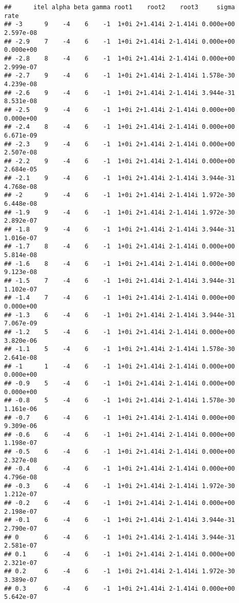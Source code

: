 \documentclass[
  12pt,
]{article}
\begin{document}
\begin{verbatim}
##      itel alpha beta gamma root1    root2    root3     sigma      rate
## -3      9    -4    6    -1  1+0i 2+1.414i 2-1.414i 0.000e+00 2.597e-08
## -2.9    7    -4    6    -1  1+0i 2+1.414i 2-1.414i 0.000e+00 0.000e+00
## -2.8    8    -4    6    -1  1+0i 2+1.414i 2-1.414i 0.000e+00 2.999e-07
## -2.7    9    -4    6    -1  1+0i 2+1.414i 2-1.414i 1.578e-30 4.239e-08
## -2.6    9    -4    6    -1  1+0i 2+1.414i 2-1.414i 3.944e-31 8.531e-08
## -2.5    9    -4    6    -1  1+0i 2+1.414i 2-1.414i 0.000e+00 0.000e+00
## -2.4    8    -4    6    -1  1+0i 2+1.414i 2-1.414i 0.000e+00 6.671e-09
## -2.3    9    -4    6    -1  1+0i 2+1.414i 2-1.414i 0.000e+00 2.507e-08
## -2.2    9    -4    6    -1  1+0i 2+1.414i 2-1.414i 0.000e+00 2.684e-05
## -2.1    9    -4    6    -1  1+0i 2+1.414i 2-1.414i 3.944e-31 4.768e-08
## -2      9    -4    6    -1  1+0i 2+1.414i 2-1.414i 1.972e-30 6.448e-08
## -1.9    9    -4    6    -1  1+0i 2+1.414i 2-1.414i 1.972e-30 2.892e-07
## -1.8    9    -4    6    -1  1+0i 2+1.414i 2-1.414i 3.944e-31 1.016e-07
## -1.7    8    -4    6    -1  1+0i 2+1.414i 2-1.414i 0.000e+00 5.814e-08
## -1.6    8    -4    6    -1  1+0i 2+1.414i 2-1.414i 0.000e+00 9.123e-08
## -1.5    7    -4    6    -1  1+0i 2+1.414i 2-1.414i 3.944e-31 1.102e-07
## -1.4    7    -4    6    -1  1+0i 2+1.414i 2-1.414i 0.000e+00 0.000e+00
## -1.3    6    -4    6    -1  1+0i 2+1.414i 2-1.414i 3.944e-31 7.067e-09
## -1.2    5    -4    6    -1  1+0i 2+1.414i 2-1.414i 0.000e+00 3.820e-06
## -1.1    5    -4    6    -1  1+0i 2+1.414i 2-1.414i 1.578e-30 2.641e-08
## -1      1    -4    6    -1  1+0i 2+1.414i 2-1.414i 0.000e+00 0.000e+00
## -0.9    5    -4    6    -1  1+0i 2+1.414i 2-1.414i 0.000e+00 0.000e+00
## -0.8    5    -4    6    -1  1+0i 2+1.414i 2-1.414i 1.578e-30 1.161e-06
## -0.7    6    -4    6    -1  1+0i 2+1.414i 2-1.414i 0.000e+00 9.309e-06
## -0.6    6    -4    6    -1  1+0i 2+1.414i 2-1.414i 0.000e+00 1.198e-07
## -0.5    6    -4    6    -1  1+0i 2+1.414i 2-1.414i 0.000e+00 2.327e-08
## -0.4    6    -4    6    -1  1+0i 2+1.414i 2-1.414i 0.000e+00 4.796e-08
## -0.3    6    -4    6    -1  1+0i 2+1.414i 2-1.414i 1.972e-30 1.212e-07
## -0.2    6    -4    6    -1  1+0i 2+1.414i 2-1.414i 0.000e+00 2.198e-07
## -0.1    6    -4    6    -1  1+0i 2+1.414i 2-1.414i 3.944e-31 2.790e-07
## 0       6    -4    6    -1  1+0i 2+1.414i 2-1.414i 3.944e-31 2.581e-07
## 0.1     6    -4    6    -1  1+0i 2+1.414i 2-1.414i 0.000e+00 2.321e-07
## 0.2     6    -4    6    -1  1+0i 2+1.414i 2-1.414i 1.972e-30 3.389e-07
## 0.3     6    -4    6    -1  1+0i 2+1.414i 2-1.414i 0.000e+00 5.642e-07

\end{verbatim}
\end{document}
